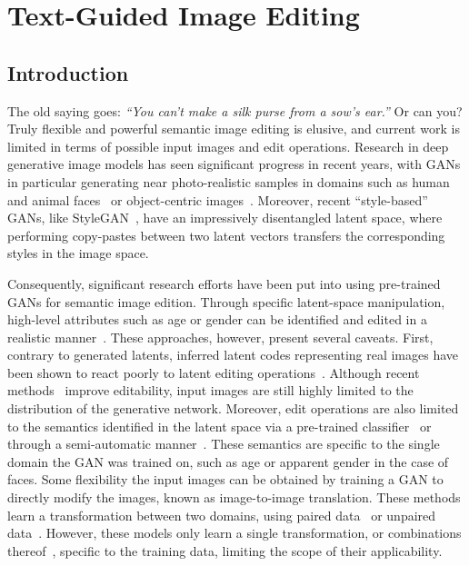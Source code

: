 \chapter{Text-Guided Image Editing}
\label{chapter:flexit}

\newpage

\minitoc
{}




\section{Introduction}

The old saying goes: \emph{``You can’t make a silk purse from a sow’s ear.''} Or can you?
%
Truly flexible and powerful semantic image editing is elusive, and current work is  
limited in terms of possible input images and edit operations. Research in deep 
generative image models has seen significant progress in recent years, with GANs 
in particular  generating near photo-realistic samples in domains such as human and 
animal faces~\cite{karras20nips} or object-centric images~\cite{brock19iclr}. Moreover,
 recent ``style-based'' GANs, like
  StyleGAN~\cite{karras19cvpr, karras20cvpr, Karras2021stylegan3}, have an
   impressively disentangled latent space, where  performing copy-pastes between two 
   latent vectors transfers the corresponding styles in the image space. 

Consequently, significant research efforts have been put into using pre-trained GANs 
for semantic image edition. Through specific latent-space manipulation, high-level 
attributes such as age or gender can be identified and edited in a realistic 
manner~\cite{shen2020, abdal2020styleflow, zhuang2021enjoy, harkonen2020ganspace}.
 These approaches, however, present several caveats. 
First, contrary to generated latents, inferred latent codes representing  real images
 have been shown to react poorly to latent editing operations~\cite{grechka2021magec}.
Although recent methods~\cite{grechka2021magec, tov2021designing, zhu2020indomain} 
improve editability, input images are still highly limited to the distribution of the 
generative network. Moreover, edit operations are also limited to the semantics 
identified in the latent space via a pre-trained 
classifier~\cite{zhuang2021enjoy, shen2020, abdal2020styleflow} or through a
 semi-automatic manner~\cite{voynov20icml, harkonen2020ganspace}. These semantics are
  specific to the single domain the GAN was trained on, such as age or apparent gender 
  in the case of faces.
%
Some flexibility \wrt the input images can be obtained by training a GAN to directly 
modify the images, known as image-to-image translation. These methods learn a 
transformation between two domains, using paired 
data~\cite{isola17cvpr, pix2pixhd, gaugan} or unpaired 
data~\cite{zhu17iccv, choi2020starganv2}. However, these models only learn a  single
 transformation, or combinations thereof~\cite{wang20ijcv}, specific to the training 
 data,  limiting the scope of their applicability.



